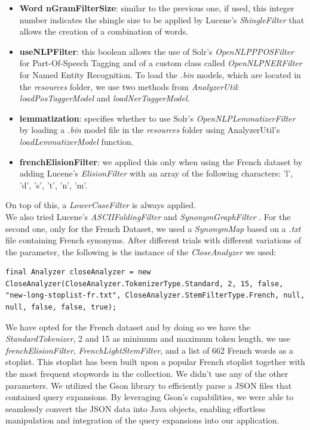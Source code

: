 \begin{itemize}
  \item \textbf{Word nGramFilterSize}: similar to the previous one, if used, this integer number indicates the shingle size to be applied by Lucene's \textit{ShingleFilter} \cite{luceneshinglefilter} that allows the creation of a combination of words.
  
  \item \textbf{useNLPFilter}: this boolean allows the use of Solr's \cite{solr} \textit{OpenNLPPPOSFilter} \cite{solropennlpposfilter} for Part-Of-Speech Tagging and of a custom class called \textit{OpenNLPNERFilter} for Named Entity Recognition. 
  To load the \textit{.bin} models, which are located in the \textit{resources} folder, we use two methods from \textit{AnalyzerUtil}: \textit{loadPosTaggerModel} and \textit{loadNerTaggerModel}.
  
  \item \textbf{lemmatization}: specifies whether to use Solr's \textit{OpenNLPLemmatizerFilter} \cite{solropennlplemmafilter} by loading a \textit{.bin} model file in the \textit{resources} folder using AnalyzerUtil's \textit{loadLemmatizerModel} function.
  
  \item \textbf{frenchElisionFilter}: we applied this only when using the French dataset by adding Lucene's \textit{ElisionFilter} \cite{luceneelisionfilter} with an array of the following characters: 'l', 'd', 's', 't', 'n', 'm'.
\end{itemize}
On top of this, a \textit{LowerCaseFilter} \cite{lucenelowercasefilter} is always applied. \\
We also tried Lucene's \textit{ASCIIFoldingFilter} \cite{luceneasciifoldingfilter} and \textit{SynonymGraphFilter} \cite{lucenesynonymgraphfilter}. 
For the second one, only for the French Dataset, we used a \textit{SynonymMap} \cite{lucenesynonymmap} based on a \textit{.txt} file containing French synonyms.
\newline
After different trials with different variations of the parameter, the following is the instance of the \textit{CloseAnalyzer} we used:

\begin{lstlisting}
final Analyzer closeAnalyzer = new CloseAnalyzer(CloseAnalyzer.TokenizerType.Standard, 2, 15, false, "new-long-stoplist-fr.txt", CloseAnalyzer.StemFilterType.French, null, null, false, false, true);
\end{lstlisting}
We have opted for the French dataset and by doing so we have the \textit{StandardTokenizer}, 2 and 15 as minimum and maximum token length, we use \textit{frenchElisionFilter}, \textit{FrenchLightStemFilter}, and a list of 662 French words as a stoplist.
This stoplist has been built upon a popular French stoplist together with the most frequent stopwords in the collection.  
We didn't use any of the other parameters.
We utilized the Gson library to efficiently parse a JSON files that contained query expansions. By leveraging Gson's capabilities, we were able to seamlessly convert the JSON data into Java objects, enabling effortless manipulation and integration of the query expansions into our application.


